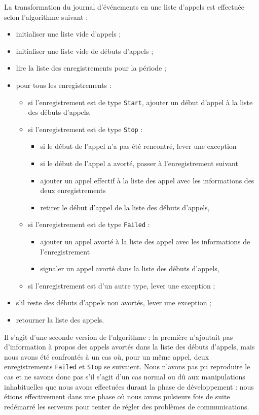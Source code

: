 La transformation du journal d’événements en une liste d’appels est effectuée selon l’algorithme suivant :
\begin{itemize}
	\item initialiser une liste vide d’appels ;
	\item initialiser une liste vide de débuts d’appels ;
	\item lire la liste des enregistrements pour la période ;
	\item pour tous les enregistrements :
		\begin{itemize}
			\item si l’enregistrement est de type \texttt{Start}, ajouter un début d’appel à la liste des débuts d’appels,
			\item si l’enregistrement est de type \texttt{Stop} :
				\begin{itemize}
					\item si le début de l’appel n’a pas été rencontré, lever une exception
					\item si le début de l’appel a avorté, passer à l’enregistrement suivant
					\item ajouter un appel effectif à la liste des appel avec les informations des deux enregistrements
					\item retirer le début d’appel de la liste des débuts d’appels,
				\end{itemize}
			\item si l’enregistrement est de type \texttt{Failed} :
				\begin{itemize}
					\item ajouter un appel avorté à la liste des appel avec les informations de l’enregistrement
					\item signaler un appel avorté dans la liste des débuts d’appels,
				\end{itemize}
			\item si l’enregistrement est d’un autre type, lever une exception ;
		\end{itemize}
	\item s’il reste des débuts d’appels non avortés, lever une exception ;
	\item retourner la liste des appels.
\end{itemize}

\vspace{1em}

Il s’agit d’une seconde version de l’algorithme : la première n’ajoutait pas d’information à propos des appels avortés dans la liste des débuts d’appels, mais nous avons été confrontés à un cas où, pour un même appel, deux enregistrements \texttt{Failed} et \texttt{Stop} se suivaient. Nous n’avons pas pu reproduire le cas et ne savons donc pas s’il s’agit d’un cas normal ou dû aux manipulations inhabituelles que nous avons effectuées durant la phase de développement : nous étions effectivement dans une phase où nous avons pulsieurs fois de suite redémarré les serveurs pour tenter de régler des problèmes de communications.
